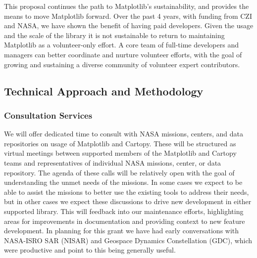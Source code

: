 \documentclass[12pt]{article}
\numberwithin{page}{section}
\begin{document}
This proposal continues the path to Matplotlib's sustainability, and provides the means to
move Matplotlib forward.  Over the past 4 years, with funding from CZI and NASA, we have
shown the benefit of having paid developers.
Given the usage and the scale of
the library it is not sustainable to return to maintaining Matplotlib as a
volunteer-only effort.  A core team of full-time developers and managers can
better coordinate and nurture volunteer efforts, with the goal of growing and
sustaining a diverse community of volunteer expert contributors.


\subsection{Technical Approach and Methodology}


\subsubsection{Consultation Services}

We will offer dedicated time to consult with NASA missions, centers, and data
repositories on usage of Matplotlib and Cartopy.  These will be structured as
virtual meetings between supported members of the Matplotlib and Cartopy teams
and representatives of individual NASA missions, center, or data repository.
The agenda of these calls will be relatively open with the goal of
understanding the unmet needs of the missions.  In some cases we expect to be
able to assist the missions to better use the existing tools to address their
needs, but in other cases we expect these discussions to drive new development
in either supported library.  This will feedback into our maintenance efforts,
highlighting areas for improvements in documentation and providing context to
new feature development.  In planning for this grant we have had early
conversations with NASA-ISRO SAR (NISAR) and Geospace Dynamics Constellation
(GDC), which were productive and point to this being generally useful.
\end{document}
